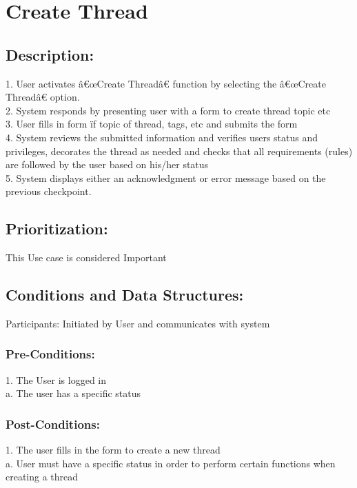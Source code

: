 \documentclass[a4paper,11pt]{article}
\begin{document}
\section{Create Thread}
\subsection*{Description:}
1.	User activates â€œCreate Threadâ€ function by selecting the â€œCreate Threadâ€ option.\\
2.	System responds by presenting user with a form to create thread topic etc\\
3.	User fills in form ïƒ  topic of thread, tags, etc and submits the form\\
4.	System reviews the submitted information and  verifies users status and privileges, decorates the thread as needed and checks that all requirements (rules) are followed by the user based on his/her status\\
5.	 System displays either an acknowledgment or error message based on the previous checkpoint.
\subsection{Prioritization:} 
This Use case is considered Important
\subsection{Conditions and Data Structures:}
Participants:
Initiated by User and communicates with system
\subsubsection*{Pre-Conditions:}
1.	The User is logged in \\
a.	The user has a specific status
\subsubsection*{Post-Conditions:}
1.	The user fills in the form to create a new thread\\
a.	User must have a specific status in order to perform certain functions when creating a thread
\end{document}
